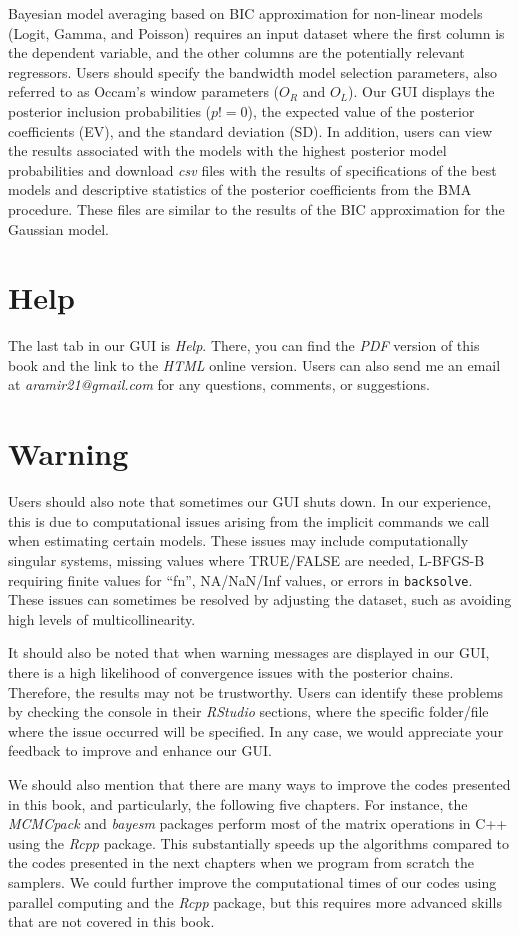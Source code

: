 Bayesian model averaging based on BIC approximation for non-linear models (Logit, Gamma, and Poisson) requires an input dataset where the first column is the dependent variable, and the other columns are the potentially relevant regressors. Users should specify the bandwidth model selection parameters, also referred to as Occam's window parameters ($O_R$ and $O_L$). Our GUI displays the posterior inclusion probabilities ($p!=0$), the expected value of the posterior coefficients (EV), and the standard deviation (SD). In addition, users can view the results associated with the models with the highest posterior model probabilities and download \textit{csv} files with the results of specifications of the best models and descriptive statistics of the posterior coefficients from the BMA procedure. These files are similar to the results of the BIC approximation for the Gaussian model.

\section{Help}\label{secGUI7}

The last tab in our GUI is \textit{Help}. There, you can find the \textit{PDF} version of this book and the link to the \textit{HTML} online version. Users can also send me an email at \textit{aramir21@gmail.com} for any questions, comments, or suggestions.

\section{Warning}\label{secGUI8}

Users should also note that sometimes our GUI shuts down. In our experience, this is due to computational issues arising from the implicit commands we call when estimating certain models. These issues may include computationally singular systems, missing values where TRUE/FALSE are needed, L-BFGS-B requiring finite values for ``fn'', NA/NaN/Inf values, or errors in \texttt{backsolve}. These issues can sometimes be resolved by adjusting the dataset, such as avoiding high levels of multicollinearity.

It should also be noted that when warning messages are displayed in our GUI, there is a high likelihood of convergence issues with the posterior chains. Therefore, the results may not be trustworthy. Users can identify these problems by checking the console in their \textit{RStudio} sections, where the specific folder/file where the issue occurred will be specified. In any case, we would appreciate your feedback to improve and enhance our GUI.

We should also mention that there are many ways to improve the codes presented in this book, and particularly, the following five chapters. For instance, the \textit{MCMCpack} and \textit{bayesm} packages perform most of the matrix operations in C++ using the \textit{Rcpp} package. This substantially speeds up the algorithms compared to the codes presented in the next chapters when we program from scratch the samplers. We could further improve the computational times of our codes using parallel computing and the \textit{Rcpp} package, but this requires more advanced skills that are not covered in this book.